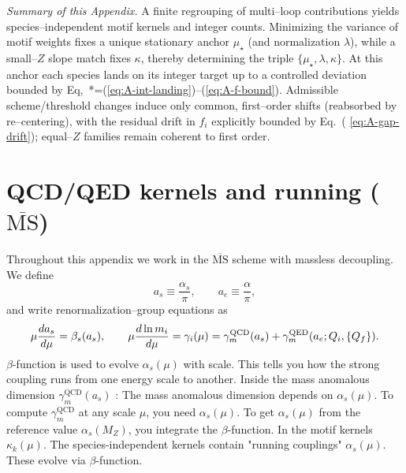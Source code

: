 \documentclass[aps,prd,onecolumn,amsmath,amssymb,superscriptaddress,nofootinbib,showpacs,showkeys]{revtex4-2}
\begin{document}
\medskip\noindent
\emph{Summary of this Appendix.} A finite regrouping of multi--loop contributions yields species--independent motif kernels and integer counts. Minimizing the variance of motif weights fixes a unique stationary anchor $\mu_\star$ (and normalization $\lambda$), while a small--$Z$ slope match fixes $\kappa$, thereby determining the triple $\{\mu_\star,\lambda,\kappa\}$. At this anchor each species lands on its integer target up to a controlled deviation bounded by Eq,~*=(\ref{eq:A-int-landing})--(\ref{eq:A-f-bound}). Admissible scheme/threshold changes induce only common, first--order shifts (reabsorbed by re--centering), with the residual drift in $f_i$ explicitly bounded by Eq.~( \ref{eq:A-gap-drift}); equal--$Z$ families remain coherent to first order.



















\section{QCD/QED kernels and running \texorpdfstring{($\overline{\mathrm{MS}}$)}{(MS-bar)}}

Throughout this appendix we work in the $\overline{\mathrm{MS}}$ scheme with massless decoupling. We define
\[
a_s \equiv \frac{\alpha_s}{\pi}, \qquad a_e \equiv \frac{\alpha}{\pi},
\]
and write renormalization–group equations as
\[
\mu\frac{d a_s}{d\mu}=\beta_s(a_s),\qquad
\mu\frac{d \ln m_i}{d\mu} = \gamma_i(\mu)
= \gamma_m^{\rm QCD}(a_s) + \gamma_m^{\rm QED}(a_e;Q_i,\{Q_f\}).
\]
 $\beta$-function is used to evolve $\alpha_s(\mu)$ with scale.
This tells you how the strong coupling runs from one energy scale to another.
Inside the mass anomalous dimension $\gamma_m^{\text{QCD}}(a_s)$ :
The mass anomalous dimension depends on $\alpha_s(\mu)$. 
To compute $\gamma_m^{\text{QCD}}$ at any scale $\mu$, you need $\alpha_s(\mu)$. 
To get $\alpha_s(\mu)$ from the reference value $\alpha_s(M_Z)$, you integrate the  $\beta$-function.
In the motif kernels $\kappa_k(\mu)$. 
The species-independent kernels contain "running couplings" $\alpha_s(\mu)$. 
These evolve via $\beta$-function. 
\end{document}
